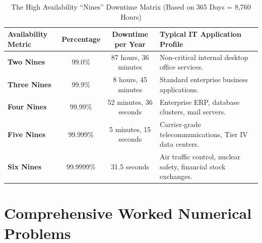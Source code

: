 \begin{table}[H]
\centering
\small
{}
\begin{tabularx}{\linewidth}{l c c X}
\toprule
\rowcolor{tableheadercolor}
\textbf{Availability Metric} & \textbf{Percentage} & \textbf{Downtime per Year} & \textbf{Typical IT Application Profile} \\
\midrule
\textbf{Two Nines} & 99.0\% & 87 hours, 36 minutes & Non-critical internal desktop office services. \\
\textbf{Three Nines} & 99.9\% & 8 hours, 45 minutes & Standard enterprise business applications. \\
\textbf{Four Nines} & 99.99\% & 52 minutes, 36 seconds & Enterprise ERP, database clusters, mail servers. \\
\textbf{Five Nines} & 99.999\% & 5 minutes, 15 seconds & Carrier-grade telecommunications, Tier IV data centers. \\
\textbf{Six Nines} & 99.9999\% & 31.5 seconds & Air traffic control, nuclear safety, financial stock exchanges. \\
\bottomrule
\end{tabularx}
\caption{The High Availability ``Nines'' Downtime Matrix (Based on 365 Days = 8,760 Hours)}
\end{table}

\section{Comprehensive Worked Numerical Problems}

